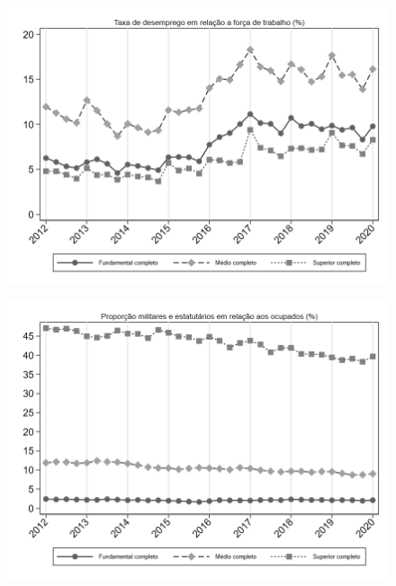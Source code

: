 \begin{frame}[label=_composicao_demografica_educacao_taxa_de_desemprego]{}
\textit{\hyperlink{_composicao_demografica_educacao}{}}
\begin{figure}
  \centering
  \includegraphics[width=1.0\linewidth]{../../analysis/output/composicao_demografica/educacao/_composicao_demografica_educacao_taxa_de_desemprego.png}
  \caption{}
  \label{fig:_composicao_demografica_educacao_taxa_de_desemprego}
\end{figure}
\end{frame}

\begin{frame}[label=_composicao_demografica_educacao_prop_militar]{}
\textit{\hyperlink{_composicao_demografica_educacao}{}}
\begin{figure}
  \centering
  \includegraphics[width=1.0\linewidth]{../../analysis/output/composicao_demografica/educacao/_composicao_demografica_educacao_prop_militar.png}
  \caption{}
  \label{fig:_composicao_demografica_educacao_prop_militar}
\end{figure}
\end{frame}


